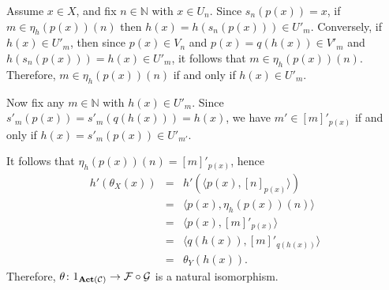 \documentclass[envcountsame]{llncs}
\def\IN{{\mathbb N}}
\def\calC{{\mathcal{C}}}
\def\calF{{\mathcal{F}}}
\def\calG{{\mathcal{G}}}
\def\act{{\mathrm{\bold{Act}}}}
\begin{document}
Assume $x\in X$, and fix $n \in \IN$ with $x\in U_n$. Since $s_n(p(x))=x$, if $m\in\eta_h(p(x))(n)$ then $h(x)=h(s_n(p(x))) \in U'_m$. Conversely, if $h(x) \in U'_m$, then since $p(x) \in V_n$ and $p(x)=q(h(x)) \in V'_m$ and $h(s_n(p(x))) = h(x) \in U'_m$, it follows that $m \in \eta_h(p(x))(n)$. Therefore, $m\in \eta_h(p(x))(n)$ if and only if $h(x)\in U'_m$. 

Now fix any $m\in\IN$ with $h(x)\in U'_m$. Since $s'_m(p(x)) = s'_m(q(h(x))) = h(x)$, we have $m' \in [m]'_{p(x)}$ if and only if $h(x)=s'_m(p(x)) \in U'_{m'}$.

It follows that $\eta_h(p(x))(n) =  [m]'_{p(x)}$, hence
\begin{eqnarray*}
h'(\theta_X(x)) &=& h'(\langle p(x), [n]_{p(x)} \rangle)\\
&=& \langle p(x), \eta_h(p(x))(n) \rangle\\
&=& \langle p(x), [m]'_{p(x)} \rangle\\
&=& \langle q(h(x)), [m]'_{q(h(x))} \rangle\\
&=& \theta_Y(h(x)). 
\end{eqnarray*}
Therefore, $\theta\colon 1_{\act(\calC)} \to \calF\circ\calG$ is a natural isomorphism.





\end{document}
